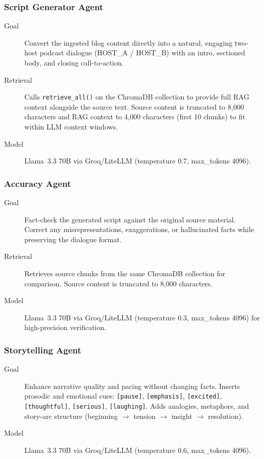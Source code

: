 \documentclass[sigconf,natbib=false]{acmart}   %
\begin{document}
\subsubsection{Script Generator Agent}
\begin{description}
  \item[Goal] Convert the ingested blog content directly into a natural, engaging two-host podcast dialogue (HOST\_A / HOST\_B) with an intro, sectioned body, and closing call-to-action.
  \item[Retrieval] Calls \texttt{retrieve\_all()} on the ChromaDB collection to provide full RAG context alongside the source text.  Source content is truncated to 8{,}000 characters and RAG context to 4{,}000 characters (first 10 chunks) to fit within LLM context windows.
  \item[Model] Llama~3.3 70B via Groq/LiteLLM (temperature 0.7, max\_tokens 4096).
\end{description}

\subsubsection{Accuracy Agent}
\begin{description}
  \item[Goal] Fact-check the generated script against the original source material.  Correct any misrepresentations, exaggerations, or hallucinated facts while preserving the dialogue format.
  \item[Retrieval] Retrieves source chunks from the same ChromaDB collection for comparison.  Source content is truncated to 8{,}000 characters.
  \item[Model] Llama~3.3 70B via Groq/LiteLLM (temperature 0.3, max\_tokens 4096) for high-precision verification.
\end{description}

\subsubsection{Storytelling Agent}
\begin{description}
  \item[Goal] Enhance narrative quality and pacing without changing facts.  Inserts prosodic and emotional cues: \texttt{[pause]}, \texttt{[emphasis]}, \texttt{[excited]}, \texttt{[thoughtful]}, \texttt{[serious]}, \texttt{[laughing]}.  Adds analogies, metaphors, and story-arc structure (beginning $\to$ tension $\to$ insight $\to$ resolution).
  \item[Model] Llama~3.3 70B via Groq/LiteLLM (temperature 0.6, max\_tokens 4096).
\end{description}
\end{document}
